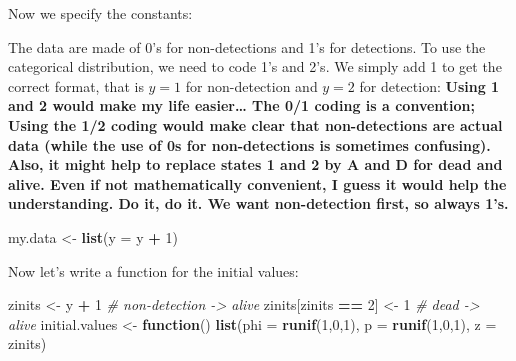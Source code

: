\documentclass[
  12pt,
]{krantz}
\newenvironment{Shaded}{\begin{snugshade}}{\end{snugshade}}
\newcommand{\AttributeTok}[1]{\textcolor[rgb]{0.13,0.29,0.53}{#1}}
\newcommand{\CommentTok}[1]{\textcolor[rgb]{0.56,0.35,0.01}{\textit{#1}}}
\newcommand{\ControlFlowTok}[1]{\textcolor[rgb]{0.13,0.29,0.53}{\textbf{#1}}}
\newcommand{\DecValTok}[1]{\textcolor[rgb]{0.00,0.00,0.81}{#1}}
\newcommand{\DocumentationTok}[1]{\textcolor[rgb]{0.56,0.35,0.01}{\textbf{\textit{#1}}}}
\newcommand{\FunctionTok}[1]{\textcolor[rgb]{0.13,0.29,0.53}{\textbf{#1}}}
\newcommand{\NormalTok}[1]{#1}
\newcommand{\OtherTok}[1]{\textcolor[rgb]{0.56,0.35,0.01}{#1}}
\newcommand{\SpecialCharTok}[1]{\textcolor[rgb]{0.81,0.36,0.00}{\textbf{#1}}}
\begin{document}
Now we specify the constants:

\begin{Shaded}
\end{Shaded}

The data are made of 0's for non-detections and 1's for detections. To use the categorical distribution, we need to code 1's and 2's. We simply add 1 to get the correct format, that is \(y = 1\) for non-detection and \(y = 2\) for detection: \textbf{Using 1 and 2 would make my life easier\ldots{} The 0/1 coding is a convention; Using the 1/2 coding would make clear that non-detections are actual data (while the use of 0s for non-detections is sometimes confusing). Also, it might help to replace states 1 and 2 by A and D for dead and alive. Even if not mathematically convenient, I guess it would help the understanding. Do it, do it. We want non-detection first, so always 1's.}

\begin{Shaded}
\begin{Highlighting}[]
\NormalTok{my.data }\OtherTok{\textless{}{-}} \FunctionTok{list}\NormalTok{(}\AttributeTok{y =}\NormalTok{ y }\SpecialCharTok{+} \DecValTok{1}\NormalTok{)}
\end{Highlighting}
\end{Shaded}

Now let's write a function for the initial values:

\begin{Shaded}
\begin{Highlighting}[]
\NormalTok{zinits }\OtherTok{\textless{}{-}}\NormalTok{ y }\SpecialCharTok{+} \DecValTok{1} \CommentTok{\# non{-}detection {-}\textgreater{} alive}
\NormalTok{zinits[zinits }\SpecialCharTok{==} \DecValTok{2}\NormalTok{] }\OtherTok{\textless{}{-}} \DecValTok{1} \CommentTok{\# dead {-}\textgreater{} alive}
\NormalTok{initial.values }\OtherTok{\textless{}{-}} \ControlFlowTok{function}\NormalTok{() }\FunctionTok{list}\NormalTok{(}\AttributeTok{phi =} \FunctionTok{runif}\NormalTok{(}\DecValTok{1}\NormalTok{,}\DecValTok{0}\NormalTok{,}\DecValTok{1}\NormalTok{),}
                                  \AttributeTok{p =} \FunctionTok{runif}\NormalTok{(}\DecValTok{1}\NormalTok{,}\DecValTok{0}\NormalTok{,}\DecValTok{1}\NormalTok{),}
                                  \AttributeTok{z =}\NormalTok{ zinits)}
\end{Highlighting}
\end{Shaded}
\end{document}
